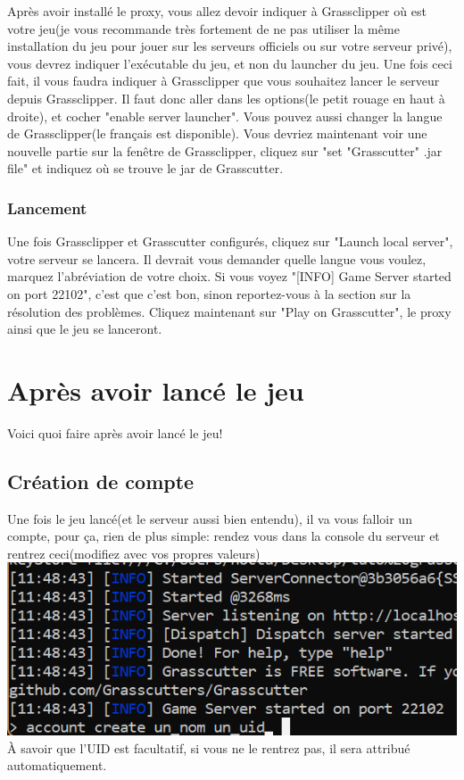 \documentclass{article}
\begin{document}
Après avoir installé le proxy, vous allez devoir indiquer à Grassclipper où est votre jeu(je vous recommande très fortement de ne pas utiliser la même installation du jeu pour jouer sur les serveurs officiels ou sur votre serveur privé), vous devrez indiquer l'exécutable du jeu, et non du launcher du jeu.\newline
Une fois ceci fait, il vous faudra indiquer à Grassclipper que vous souhaitez lancer le serveur depuis Grassclipper. Il faut donc aller dans les options(le petit rouage en haut à droite), et cocher "enable server launcher". Vous pouvez aussi changer la langue de Grassclipper(le français est disponible).\newline
Vous devriez maintenant voir une nouvelle partie sur la fenêtre de Grassclipper, cliquez sur "set "Grasscutter" .jar file" et indiquez où se trouve le jar de Grasscutter. 

\subsubsection{Lancement}
Une fois Grassclipper et Grasscutter configurés, cliquez sur "Launch local server", votre serveur se lancera. Il devrait vous demander quelle langue vous voulez, marquez l'abréviation de votre choix. Si vous voyez "[INFO] Game Server started on port 22102", c'est que c'est bon, sinon reportez-vous à la section sur la résolution des problèmes.\newline
Cliquez maintenant sur "Play on Grasscutter", le proxy ainsi que le jeu se lanceront.

\hrulefill

\section{Après avoir lancé le jeu}
Voici quoi faire après avoir lancé le jeu!

\subsection{Création de compte}
Une fois le jeu lancé(et le serveur aussi bien entendu), il va vous falloir un compte, pour ça, rien de plus simple: rendez vous dans la console du serveur et rentrez ceci(modifiez avec vos propres valeurs)\newline
\includegraphics[scale=0.8]{img/account_create.png}\newline
À savoir que l'UID est facultatif, si vous ne le rentrez pas, il sera attribué automatiquement.\newline\newline
\end{document}
